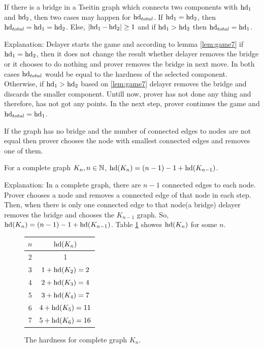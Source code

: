 \documentclass[12pt]{book}
\begin{document}
\begin{conj}\label{con:hd1}
     If there is a bridge in a Tseitin graph which connects two components with $\operatorname{hd}_1$ and $\operatorname{hd}_2$, then two cases may happen for 
	 $\operatorname{hd}_{total}$. If $\operatorname{hd}_1= \operatorname{hd}_2$, then $\operatorname{hd}_{total}= \operatorname{hd}_1= \operatorname{hd}_2$. Else, $ \lvert \operatorname{hd}_1- \operatorname{hd}_2  \rvert \geq 1$
	 and if $ \operatorname{hd}_1 > \operatorname{hd}_2 $  then $\operatorname{hd}_{total}= \operatorname{hd}_1$.
	 
	 Explanation: Delayer starts the game and according to lemma \ref{lem:game7} if $\operatorname{hd}_1= \operatorname{hd}_2$, then it does not change the result 
	 whether delayer removes the bridge or it chooses to do nothing and prover removes the bridge in next move. In both cases $\operatorname{hd}_{total}$ 
	 would be equal to the hardness of the selected component. Otherwise, if $ \operatorname{hd}_1 > \operatorname{hd}_2 $ based on \ref{lem:game7} delayer 
	 removes the bridge and discards the smaller component. Untill now, prover has not done any thing and therefore, has not got any points.
	 In the next step, prover continues the game and  $\operatorname{hd}_{total}= \operatorname{hd}_1$.
\end{conj}

\begin{conj}\label{con:hd2}
           If the graph has no bridge and the number of connected edges to nodes are not equal then prover chooses the node with smallest
		   connected edges and removes one of them.
\end{conj}
	  
\begin{conj}\label{con:hd_game1}
      For a complete graph $K_n, n \in \mathbb{N}$, $\operatorname{hd}(K_n)= (n-1)-1+\operatorname{hd}(K_{n-1})$. 
	  
	  Explanation: In a complete graph, there are $n-1$ connected edges to each node. 	  Prover chooses a node and removes a connected edge of 
	  that node in each step. Then, when there is only one connected edge to that node(a bridge) delayer removes the bridge and chooses the 
	  $K_{n-1}$ graph. So, $\operatorname{hd}(K_n)= (n-1)-1+\operatorname{hd}(K_{n-1}) $.
	  Table \ref{fig:table1} showes $\operatorname{hd}(K_n)$ for some $n$.
	  \begin{figure}[h]
       \centering
       \begin{tabular}{|c|c|} 
                  \hline
                  $n$ & $\operatorname{hd}(K_n)$ \\ \hline
				  2 & 1  \\ \hline
				  3 & $1+ \operatorname{hd}(K_2)=2$ \\ \hline
			      4 & $2+ \operatorname{hd}(K_3)=4$  \\ \hline
				  5 & $3+ \operatorname{hd}(K_4)=7$  \\ \hline
				  6 & $4+ \operatorname{hd}(K_5)=11$  \\ \hline
				  7 & $5+ \operatorname{hd}(K_6)=16$  \\ \hline
       \end{tabular}
       \caption{The hardness for complete graph $K_n$.}
       \label{fig:table1}
      \end{figure}
\end{conj}
\end{document}
